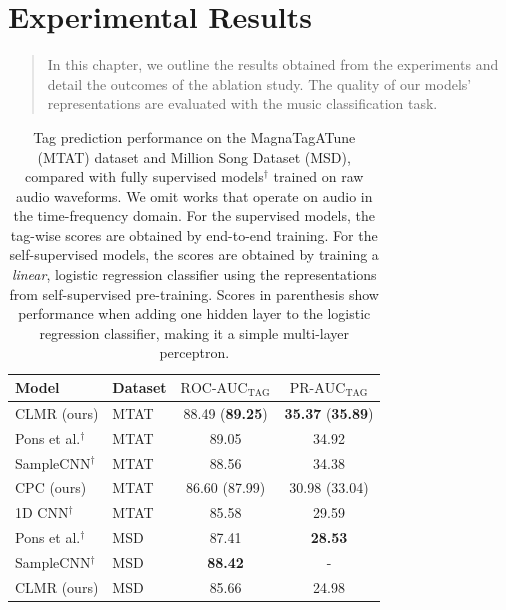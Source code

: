\chapter{Experimental Results}\label{sec:results}

\begin{quote}
    In this chapter, we outline the results obtained from the experiments and detail the outcomes of the ablation study. The quality of our models' representations are evaluated with the music classification task.
\end{quote}

\begin{table}
    \centering
    \begin{tabular}{@{}llcc@{}}\toprule
        Model & Dataset & $\text{ROC-AUC}_\text{TAG}$ & $\text{PR-AUC}_\text{TAG}$ \\ \midrule
        CLMR (ours) & MTAT & 88.49 (\textbf{89.25}) & \textbf{35.37} (\textbf{35.89}) \\
        Pons et al.$^\dagger$ & MTAT & 89.05 & 34.92 \\
        SampleCNN$^\dagger$ & MTAT & 88.56 & 34.38 \\
        CPC (ours) & MTAT & 86.60 (87.99) & 30.98 (33.04) \\
        1D CNN$^\dagger$ & MTAT & 85.58 & 29.59 \\\midrule
        Pons et al.$^\dagger$ & MSD & 87.41 & \textbf{28.53} \\
        SampleCNN$^\dagger$ & MSD & \textbf{88.42} & - \\
        CLMR (ours) & MSD & 85.66 & 24.98 \\
        \bottomrule
    \end{tabular}
    \caption{Tag prediction performance on the MagnaTagATune (MTAT) dataset and Million Song Dataset (MSD), compared with fully supervised models$^\dagger$ trained on raw audio waveforms.
    We omit works that operate on audio in the time-frequency domain.
For the supervised models, the tag-wise scores are obtained by end-to-end training.
For the self-supervised models, the scores are obtained by training a \emph{linear}, logistic regression classifier using the representations from self-supervised pre-training.
Scores in parenthesis show performance when adding one hidden layer to the logistic regression classifier, making it a simple multi-layer perceptron.}
    \label{tab:results}
\end{table}


